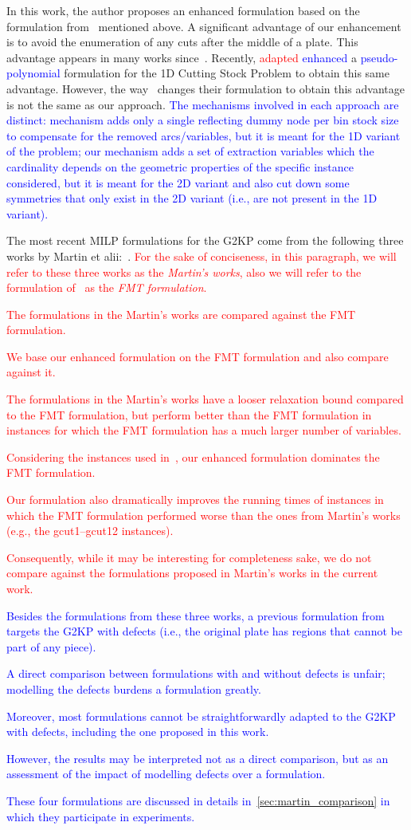 \documentclass[ppgc,tese,english,formais,babel]{iiufrgs}
\newif\iffinalversion
\newcommand{\newtext}[1]{\iffinalversion%
#1%
\else%
\textcolor{blue}{#1}%
\fi%
}
\newcommand{\oldtext}[1]{\iffinalversion%
\else%
\textcolor{red}{#1}%
\fi%
}
\begin{document}
In this work, the author proposes an enhanced formulation based on the formulation from~\citet{furini:2016} mentioned above.
A significant advantage of our enhancement is to avoid the enumeration of any cuts after the middle of a plate.
This advantage appears in many works since~\citet{herz:1972}.
Recently, \citet{delorme:2019} \oldtext{adapted}\newtext{enhanced} a \newtext{pseudo-polynomial} formulation for the 1D Cutting Stock Problem to obtain this same advantage.
However, the way \citet{delorme:2019}~changes their formulation to obtain this advantage is not the same as our approach.
\newtext{The mechanisms involved in each approach are distinct: \citet{delorme:2019} mechanism adds only a single reflecting dummy node per bin stock size to compensate for the removed arcs/variables, but it is meant for the 1D variant of the problem; our mechanism adds a set of extraction variables which the cardinality depends on the geometric properties of the specific instance considered, but it is meant for the 2D variant and also cut down some symmetries that only exist in the 2D variant (i.e., are not present in the 1D variant).}

The most recent MILP formulations for the G2KP come from the following three works by Martin et alii:~\citet{martin:2020:models,martin:2020:bottom,martin:2020:top}.
\oldtext{For the sake of conciseness, in this paragraph, we will refer to these three works as the \emph{Martin's works}, also we will refer to the formulation of~\citet{furini:2016} as the \emph{FMT formulation}.}
\oldtext{The formulations in the Martin's works are compared against the FMT formulation.}
\oldtext{We base our enhanced formulation on the FMT formulation and also compare against it.}
\oldtext{The formulations in the Martin's works have a looser relaxation bound compared to the FMT formulation, but perform better than the FMT formulation in instances for which the FMT formulation has a much larger number of variables.}
\oldtext{Considering the instances used in~\citet{furini:2016}, our enhanced formulation dominates the FMT formulation.}
\oldtext{Our formulation also dramatically improves the running times of instances in which the FMT formulation performed worse than the ones from Martin's works (e.g., the gcut1--gcut12 instances).}
\oldtext{Consequently, while it may be interesting for completeness sake, we do not compare against the formulations proposed in Martin's works in the current work.}
\newtext{Besides the formulations from these three works, a previous formulation from \citet{martin:2019} targets the G2KP with defects (i.e., the original plate has regions that cannot be part of any piece).}
\newtext{A direct comparison between formulations with and without defects is unfair; modelling the defects burdens a formulation greatly.}
\newtext{Moreover, most formulations cannot be straightforwardly adapted to the G2KP with defects, including the one proposed in this work.}
\newtext{However, the results may be interpreted not as a direct comparison, but as an assessment of the impact of modelling defects over a formulation.}
\newtext{These four formulations are discussed in details in~\cref{sec:martin_comparison} in which they participate in experiments.}
\end{document}
